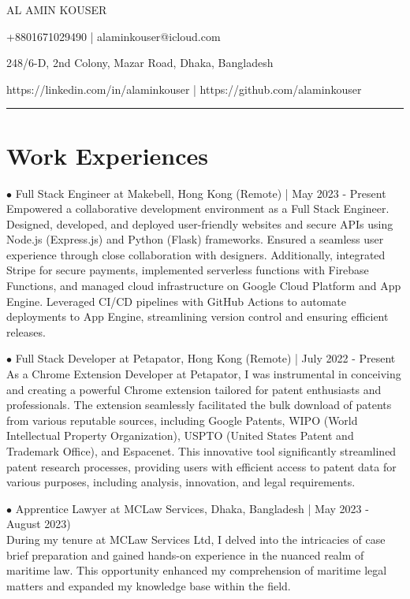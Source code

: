 \documentclass{class}
\begin{document}
\par{
	\fontsize{16pt}{16pt}\selectfont\centerline{AL AMIN KOUSER}
}
\par{
	\centerline{
		+8801671029490 | alaminkouser@icloud.com
	}
}
\par{
	\centerline{
		248/6-D, 2nd Colony, Mazar Road, Dhaka, Bangladesh
	}
}
\par{
	\centerline{
		https://linkedin.com/in/alaminkouser | https://github.com/alaminkouser
	}
}
\hrule
\vspace{0.1cm}

\section{Work Experiences}

$\bullet$ Full Stack Engineer at Makebell, Hong Kong (Remote) | May 2023 -
Present\\
\leftskip 10pt
Empowered a collaborative development environment as a Full Stack Engineer.
Designed, developed, and deployed user-friendly websites and secure APIs using
Node.js (Express.js) and Python (Flask) frameworks. Ensured a seamless user
experience through close collaboration with designers. Additionally, integrated
Stripe for secure payments, implemented serverless functions with Firebase
Functions, and managed cloud infrastructure on Google Cloud Platform and App
Engine. Leveraged CI/CD pipelines with GitHub Actions to automate deployments
to App Engine, streamlining version control and ensuring efficient releases.\\
\leftskip 0pt

$\bullet$ Full Stack Developer at Petapator, Hong Kong (Remote) | July 2022 -
Present\\
\leftskip 10pt
As a Chrome Extension Developer at Petapator, I was instrumental in conceiving
and creating a powerful Chrome extension tailored for patent enthusiasts and
professionals. The extension seamlessly facilitated the bulk download of patents
from various reputable sources, including Google Patents, WIPO (World
Intellectual Property Organization), USPTO (United States Patent and Trademark
Office), and Espacenet. This innovative tool significantly streamlined patent
research processes, providing users with efficient access to patent data for
various purposes, including analysis, innovation, and legal requirements.\\
\leftskip 0pt

$\bullet$ Apprentice Lawyer at MCLaw Services, Dhaka, Bangladesh | May 2023 -
August 2023)\\
\leftskip 10pt
During my tenure at MCLaw Services Ltd, I delved into the intricacies of case
brief preparation and gained hands-on experience in the nuanced realm of
maritime law. This opportunity enhanced my comprehension of maritime legal
matters and expanded my knowledge base within the field.\\
\leftskip 0pt
\end{document}
